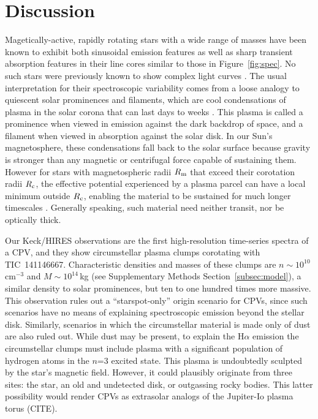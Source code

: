 \documentclass{nature3}
\begin{document}
\section{Discussion}

Magetically-active, rapidly rotating stars with a wide range of masses
have been known to exhibit both sinusoidal emission features
\cite{Donati2000,Townsend2005,Dunstone2006,Skelly2008} as well as
sharp transient absorption features in their line cores
\cite{CollierCameron1989,CollierCameron1992,Cang2020} similar to those
in Figure~\ref{fig:spec}.  No such stars were previously known to show
complex light curves \cite{Bouma2024}.  The usual interpretation for
their spectroscopic variability comes from a loose analogy to
quiescent solar prominences and filaments, which are cool
condensations of plasma in the solar corona that can last days to
weeks \cite{VialEngvold2015}.  This plasma is called a prominence when
viewed in emission against the dark backdrop of space, and a filament
when viewed in absorption against the solar disk.  In our Sun's
magnetosphere, these condensations fall back to the solar surface
because gravity is stronger than any magnetic or centrifugal force
capable of sustaining them.  However for stars with magnetospheric
radii $R_{\rm m}$ that exceed their corotation radii $R_{\rm c}$, the
effective potential experienced by a plasma parcel can have a local minimum
outside $R_{\rm c}$, enabling the material to be sustained for
much longer timescales \cite{Petit2013,Daley-Yates2024}.  Generally
speaking, such material need neither transit, nor be optically thick.

Our Keck/HIRES observations are the first high-resolution time-series
spectra of a CPV, and they show circumstellar plasma clumps corotating
with TIC~141146667.  Characteristic densities and masses of these
clumps are $n \sim 10^{10}$\,cm$^{-3}$ and $M \sim 10^{14}$\,kg (see
Supplementary Methods Section~\ref{subsec:model}), a similar density
to solar prominences, but ten to one hundred times more massive.  This
observation rules out a ``starspot-only'' origin scenario for CPVs,
\cite{Koen2021} since such scenarios have no means of explaining
spectroscopic emission beyond the stellar disk.  Similarly, scenarios
in which the circumstellar material is made only of dust are also
ruled out.  While dust may be present, to explain the H$\alpha$
emission the circumstellar clumps must include plasma with a
significant population of hydrogen atoms in the $n$=3 excited state.
This plasma is undoubtedly sculpted by the star's magnetic field.
However, it could plausibly originate from three sites:
the star, an old and undetected disk, or outgassing rocky bodies.
This latter possibility would render CPVs as extrasolar analogs of
the Jupiter-Io plasma torus (CITE).
\end{document}
